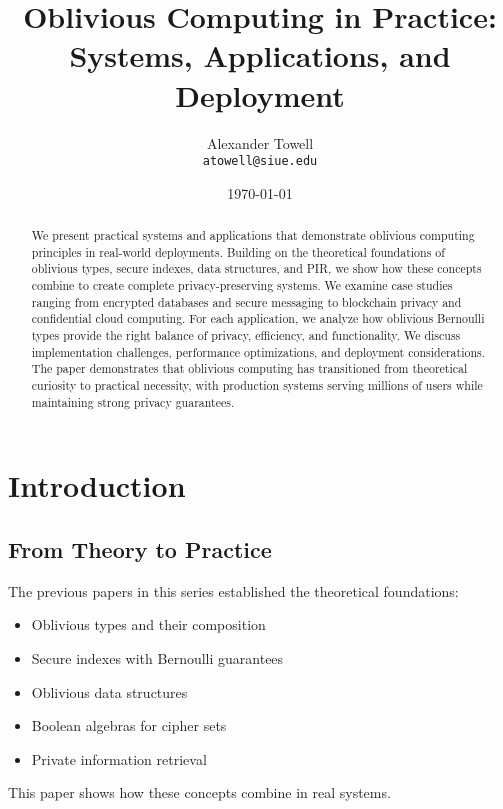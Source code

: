\documentclass[11pt,final]{article}
\title{Oblivious Computing in Practice: Systems, Applications, and Deployment}
\author{
    Alexander Towell\\
    \texttt{atowell@siue.edu}
}
\date{\today}
\begin{document}
\maketitle

\begin{abstract}
We present practical systems and applications that demonstrate oblivious computing principles in real-world deployments. Building on the theoretical foundations of oblivious types, secure indexes, data structures, and PIR, we show how these concepts combine to create complete privacy-preserving systems. We examine case studies ranging from encrypted databases and secure messaging to blockchain privacy and confidential cloud computing. For each application, we analyze how oblivious Bernoulli types provide the right balance of privacy, efficiency, and functionality. We discuss implementation challenges, performance optimizations, and deployment considerations. The paper demonstrates that oblivious computing has transitioned from theoretical curiosity to practical necessity, with production systems serving millions of users while maintaining strong privacy guarantees.
\end{abstract}


\ObliviousNotationGuide

\section{Introduction}

\subsection{From Theory to Practice}

The previous papers in this series established the theoretical foundations:
\begin{itemize}
    \item Oblivious types and their composition
    \item Secure indexes with Bernoulli guarantees
    \item Oblivious data structures
    \item Boolean algebras for cipher sets
    \item Private information retrieval
\end{itemize}

This paper shows how these concepts combine in real systems.
\end{document}
